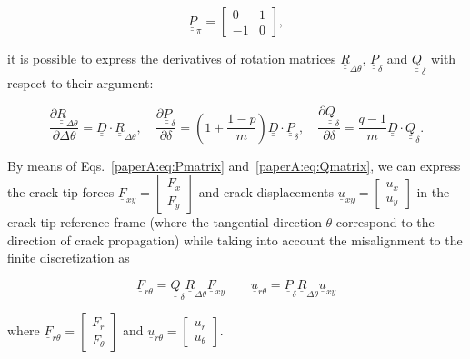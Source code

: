 \begin{equation}
\underline{\underline{P}}_{\pi}=\begin{bmatrix}
0 & 1\\
-1& 0
\end{bmatrix},
\end{equation}

it is possible to express the derivatives of rotation matrices $\underline{\underline{R}}_{\Delta\theta}$, $\underline{\underline{P}}_{\delta}$ and $\underline{\underline{Q}}_{\delta}$ with respect to their argument:

\begin{equation}\label{paperA:eq:rotmatdev}
\frac{\partial \underline{\underline{R}}_{\Delta\theta}}{\partial \Delta\theta}=\underline{\underline{D}}\cdot\underline{\underline{R}}_{\Delta\theta},\quad\frac{\partial \underline{\underline{P}}_{\delta}}{\partial \delta}=\left(1+\frac{1-p}{m}\right)\underline{\underline{D}}\cdot\underline{\underline{P}}_{\delta},\quad\frac{\partial \underline{\underline{Q}}_{\delta}}{\partial \delta}=\frac{q-1}{m}\underline{\underline{D}}\cdot\underline{\underline{Q}}_{\delta}.
\end{equation}

By means of Eqs.~\ref{paperA:eq:Pmatrix} and~\ref{paperA:eq:Qmatrix}, we can express the crack tip forces $
\underline{F}_{xy}=\begin{bmatrix}
F_{x} \\
F_{y}
\end{bmatrix}$ and crack displacements  $
\underline{u}_{xy}=\begin{bmatrix}
u_{x} \\
u_{y}
\end{bmatrix}$ in the crack tip reference frame (where the tangential direction $\theta$ correspond to the direction of crack propagation) while taking into account the misalignment to the finite  discretization as

\begin{equation}\label{paperA:eq:FUrot}
\underline{F}_{r\theta}=\underline{\underline{Q}}_{\delta}\underline{\underline{R}}_{\Delta\theta}\underline{F}_{xy}\qquad\underline{u}_{r\theta}=\underline{\underline{P}}_{\delta}\underline{\underline{R}}_{\Delta\theta}\underline{u}_{xy}
\end{equation}

where $\underline{F}_{r\theta}=\begin{bmatrix}
F_{r} \\
F_{\theta}
\end{bmatrix}$ and $\underline{u}_{r\theta}=\begin{bmatrix}
u_{r} \\
u_{\theta}
\end{bmatrix}$.

